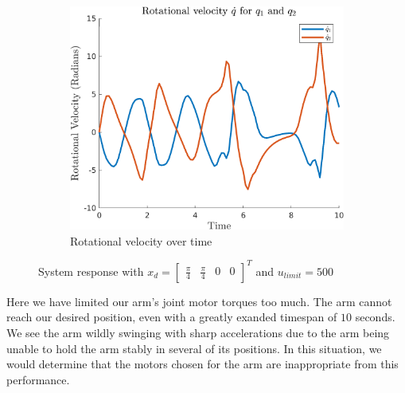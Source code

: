 \documentclass{article}
\begin{document}
\begin{figure}[H]
    \begin{subfigure}{0.325\textwidth}
        \centering
        \includegraphics[width = \textwidth]{figures/rotational-velocity-d3.png}
        \caption{Rotational velocity over time}
    \end{subfigure}
    \caption{System response with $x_d=\begin{bmatrix} \frac{\pi}{4} & \frac{\pi}{4} & 0 & 0 \end{bmatrix}^T$ and $u_{limit} = 500$}
    \label{fig:d-3_results}
\end{figure}

Here we have limited our arm's joint motor torques too much. The arm cannot reach our desired position, even with a greatly exanded timespan of $10$ seconds. We see the arm wildly swinging with sharp accelerations due to the arm being unable to hold the arm stably in several of its positions. In this situation, we would determine that the motors chosen for the arm are inappropriate from this performance.
\end{document}
